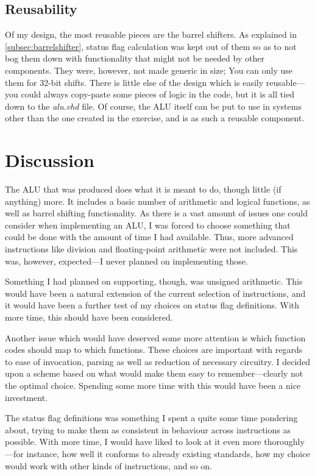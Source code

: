 \documentclass{article}
\begin{document}
\subsection{Reusability}
\label{subsec:reusability}
Of my design, the most reusable pieces are the barrel shifters. As explained in \autoref{subsec:barrelshifter}, status flag calculation was kept out of them so as to not bog them down with functionality that might not be needed by other components. They were, however, not made generic in size; You can only use them for 32-bit shifts. There is little else of the design which is easily reusable---you could always copy-paste some pieces of logic in the code, but it is all tied down to the {\em alu.vhd} file. Of course, the ALU itself can be put to use in systems other than the one created in the exercise, and is as such a reusable component.

\section{Discussion}
\label{sec:discussion}
The ALU that was produced does what it is meant to do, though little (if anything) more. It includes a basic number of arithmetic and logical functions, as well as barrel shifting functionality. As there is a vast amount of issues one could consider when implementing an ALU, I was forced to choose something that could be done with the amount of time I had available. Thus, more advanced instructions like division and floating-point arithmetic were not included. This was, however, expected---I never planned on implementing those. 

Something I had planned on supporting, though, was unsigned arithmetic. This would have been a natural extension of the current selection of instructions, and it would have been a further test of my choices on status flag definitions. With more time, this should have been considered.

Another issue which would have deserved some more attention is which function codes should map to which functions. These choices are important with regards to ease of invocation, parsing as well as reduction of necessary circuitry. I decided upon a scheme based on what would make them easy to remember---clearly not the optimal choice. Spending some more time with this would have been a nice investment.

The status flag definitions was something I spent a quite some time pondering about, trying to make them as consistent in behaviour across instructions as possible. With more time, I would have liked to look at it even more thoroughly---for instance, how well it conforms to already existing standards, how my choice would work with other kinds of instructions, and so on.
\end{document}
